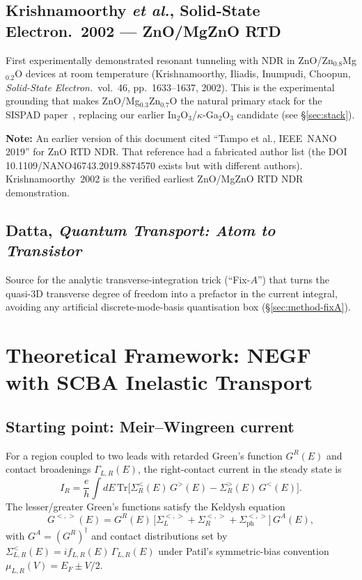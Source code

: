\documentclass[11pt,a4paper,onecolumn]{article}
\begin{document}
\subsection{Krishnamoorthy \textit{et al.}, Solid-State Electron.\ 2002 --- ZnO/MgZnO RTD}
First experimentally demonstrated resonant tunneling with NDR in
ZnO/Zn$_{0.8}$Mg$_{0.2}$O devices at room temperature
(Krishnamoorthy, Iliadis, Inumpudi, Choopun, \textit{Solid-State Electron.}\
vol.~46, pp.~1633--1637, 2002). This is the experimental grounding that
makes ZnO/Mg$_{0.3}$Zn$_{0.7}$O the natural primary stack for the SISPAD
paper~\cite{krishnamoorthy2002}, replacing our earlier
In$_2$O$_3$/$\kappa$-Ga$_2$O$_3$ candidate (see \S\ref{sec:stack}).

\textbf{Note:} An earlier version of this document cited ``Tampo et al.,
IEEE~NANO 2019'' for ZnO RTD NDR. That reference had a fabricated author
list (the DOI 10.1109/NANO46743.2019.8874570 exists but with different
authors). Krishnamoorthy~2002 is the verified earliest ZnO/MgZnO RTD NDR
demonstration.

\subsection{Datta, \textit{Quantum Transport: Atom to Transistor}}
Source for the analytic transverse-integration trick (``Fix-$A$'') that
turns the quasi-3D transverse degree of freedom into a prefactor in the
current integral, avoiding any artificial discrete-mode-basis
quantisation box (\S\ref{sec:method-fixA}).

\section{Theoretical Framework: NEGF with SCBA Inelastic Transport}

\subsection{Starting point: Meir--Wingreen current}
For a region coupled to two leads with retarded Green's function $G^R(E)$
and contact broadenings $\Gamma_{L,R}(E)$, the right-contact current in
the steady state is
\begin{equation}
I_R = \frac{e}{h}\int dE\,\mathrm{Tr}\bigl[\Sigma^{<}_R(E)\,G^{>}(E) -
\Sigma^{>}_R(E)\,G^{<}(E)\bigr].
\end{equation}
The lesser/greater Green's functions satisfy the Keldysh equation
\begin{equation}
G^{<,>}(E) = G^R(E)\,\bigl[\Sigma^{<,>}_L + \Sigma^{<,>}_R +
\Sigma^{<,>}_{\mathrm{ph}}\bigr]\,G^A(E),
\label{eq:keldysh}
\end{equation}
with $G^A = (G^R)^\dagger$ and contact distributions set by
$\Sigma^{<}_{L,R}(E) = i f_{L,R}(E)\,\Gamma_{L,R}(E)$ under Patil's
symmetric-bias convention $\mu_{L,R}(V) = E_F \pm V/2$.
\end{document}
